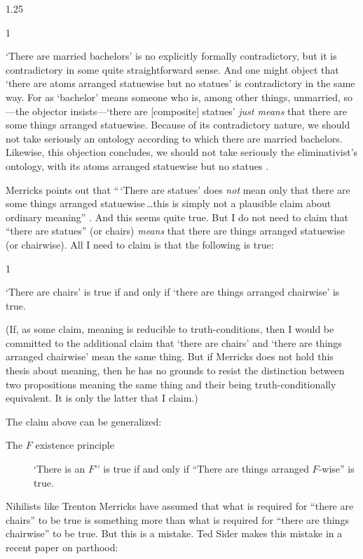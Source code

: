 \documentclass[11pt]{article}
\newenvironment{squote}{%
\begin{spacing}{1}
       	\begin{list}{}{%
\setlength{\labelwidth}{0pt}%
\rightmargin\leftmargin%
}
\item\relax
}{%
\end{list}%
\end{spacing}
}
\begin{document}
\begin{spacing}{1.25}
\begin{squote}
`There are married bachelors' is no explicitly formally contradictory,
  but it is contradictory in some quite straightforward sense.  And
  one might object that `there are atoms arranged statuewise but no
  statues' is contradictory in the same way.  For as `bachelor' means
  someone who is, among other things, unmarried, so---the objector
  insists---`there are [composite] statues' {\em just means} that
  there are some things arranged statuewise.  Because of its
  contradictory nature, we should not take seriously an ontology
  according to which there are married bachelors.  Likewise, this
  objection concludes, we should not take seriously the
  eliminativist's ontology, with its atoms arranged statuewise but no
  statues \citeyearpar[13]{merricks2001a}.
\end{squote}

Merricks points out that ``\,`There are statues' does {\em not} mean
only that there are some things arranged statuewise\,\ldots this is
simply not a plausible claim about ordinary meaning''
\citeyearpar[13]{merricks2001a}.  And this seems quite true.  But I do
not need to claim that ``there are statues'' (or chairs) {\em means}
that there are things arranged statuewise (or chairwise).  All I need
to claim is that the following is true:

\begin{squote}
`There are chairs' is true if and only if `there are things arranged
  chairwise' is true.
\end{squote}

(If, as some claim, meaning is reducible to truth-conditions, then I
would be committed to the additional claim that `there are chairs' and
`there are things arranged chairwise' mean the same thing.  But if
Merricks does not hold this thesis about meaning, then he has no
grounds to resist the distinction between two propositions meaning the
same thing and their being truth-conditionally equivalent.  It is only
the latter that I claim.)

The claim above can be generalized:

\begin{description}
  \item[The $F$ existence principle] `There is an $F$'' is true if
    and only if ``There are things arranged $F$-wise'' is
    true. \label{fwise}
\end{description}

Nihilists like Trenton Merricks have assumed that what is required for
``there are chairs'' to be true is something more than what is
required for ``there are things chairwise'' to be true.  But this is a
mistake.  Ted Sider makes this mistake in a recent paper on parthood:


\end{spacing}
\end{document}
